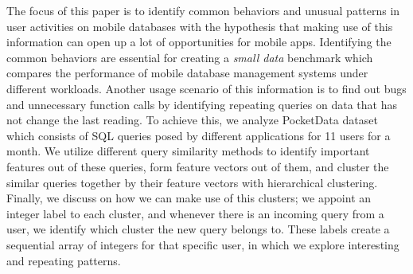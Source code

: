 The focus of this paper is to identify common behaviors and unusual patterns in user activities on mobile databases with the hypothesis that making use of this information can open up a lot of opportunities for mobile apps.
Identifying the common behaviors are essential for creating a \textit{small data} benchmark which compares the performance of mobile database management systems under different workloads.
Another usage scenario of this information is to find out bugs and unnecessary function calls by identifying repeating queries on data that has not change the last reading.
To achieve this, we analyze PocketData dataset which consists of SQL queries posed by different applications for 11 users for a month.
We utilize different query similarity methods to identify important features out of these queries, form feature vectors out of them, and cluster the similar queries together by their feature vectors with hierarchical clustering.
Finally, we discuss on how we can make use of this clusters; we appoint an integer label to each cluster, and whenever there is an incoming query from a user, we identify which cluster the new query belongs to.
These labels create a sequential array of integers for that specific user, in which we explore interesting and repeating patterns.